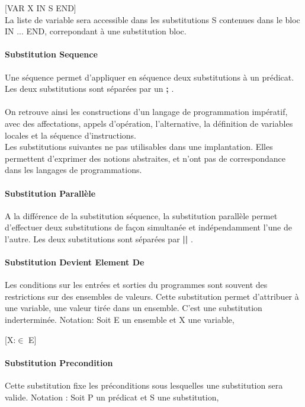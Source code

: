 [VAR X IN S END]\\
La liste de variable sera accessible dans les substitutions S contenues dans le
bloc IN ... END, correpondant à une substitution bloc.

\paragraph{Substitution Sequence}
Une séquence permet d'appliquer en séquence deux substitutions à un
prédicat. Les deux substitutions sont séparées par un \textbf{;} .

\paragraph{}
On retrouve ainsi les constructions d'un langage de programmation
impératif, avec des affectations, appels d'opération, l'alternative, la
définition de variables locales et la séquence d'instructions.\\
Les substitutions suivantes ne pas utilisables dans une implantation. Elles
permettent d'exprimer des notions abstraites, et n'ont pas de correspondance
dans les langages de programmations.

\paragraph{Substitution Parallèle}
A la différence de la substitution séquence, la substitution parallèle permet
d'effectuer deux substitutions de façon simultanée et indépendamment l'une de
l'autre. Les deux substitutions sont séparées par \textbf{||} .

\paragraph{Substitution Devient Element De}
Les conditions sur les entrées et sorties du programmes sont souvent
des restrictions sur des ensembles de valeurs. Cette substitution permet
d'attribuer à une variable, une valeur tirée dans un ensemble. C'est
une substitution inderterminée. 
Notation: Soit E un ensemble et X une variable, 

[X:$\in$ E] \\

\paragraph{Substitution Precondition}
Cette substitution fixe les
préconditions sous lesquelles une substitution sera valide. Notation : Soit P
un prédicat et S une substitution,


